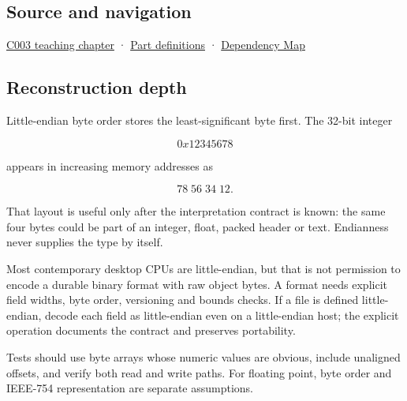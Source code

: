 \subsection{Source and navigation}\label{appendix-367b6abf460e-source-and-navigation}

\hyperref[01-foundations-i-ch002-where-the-bytes-live]{C003 teaching chapter} · \hyperref[appendix-fd090d982a15-m003---parts-41-60]{Part definitions} · \hyperref[appendix-4ad47bdd269a]{Dependency Map}

\subsection{Reconstruction depth}\label{appendix-367b6abf460e-reconstruction-depth}

Little-endian byte order stores the least-significant byte first. The 32-bit integer

\[
0x12345678
\]

appears in increasing memory addresses as

\[
78\;56\;34\;12.
\]

That layout is useful only after the interpretation contract is known: the same four bytes could be part of an integer, float, packed header or text. Endianness never supplies the type by itself.

Most contemporary desktop CPUs are little-endian, but that is not permission to encode a durable binary format with raw object bytes. A format needs explicit field widths, byte order, versioning and bounds checks. If a file is defined little-endian, decode each field as little-endian even on a little-endian host; the explicit operation documents the contract and preserves portability.

Tests should use byte arrays whose numeric values are obvious, include unaligned offsets, and verify both read and write paths. For floating point, byte order and IEEE-754 representation are separate assumptions.
